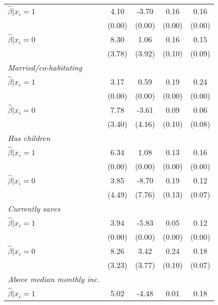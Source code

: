 \begin{table}[h]
{\begin{threeparttable}
\begin{tabular}{l*{4}{c}}
\hspace{0.5cm} \(\hat\beta|x_i=1\)&     4.10&    -3.70&     0.16&     0.16\\
                &   (0.00)&   (0.00)&   (0.00)&   (0.00)\\
\hspace{0.5cm} \(\hat\beta|x_i=0\)&     8.30&     1.06&     0.16&     0.15\\
                &   (3.78)&   (3.92)&   (0.10)&   (0.09)\\
\textit{Married/co-habitating}&         &         &         &         \\
\hspace{0.5cm} \(\hat\beta|x_i=1\)&     3.17&     0.59&     0.19&     0.24\\
                &   (0.00)&   (0.00)&   (0.00)&   (0.00)\\
\hspace{0.5cm} \(\hat\beta|x_i=0\)&     7.78&    -3.61&     0.09&     0.06\\
                &   (3.40)&   (4.16)&   (0.10)&   (0.08)\\
\textit{Has children}&         &         &         &         \\
\hspace{0.5cm} \(\hat\beta|x_i=1\)&     6.34&     1.08&     0.13&     0.16\\
                &   (0.00)&   (0.00)&   (0.00)&   (0.00)\\
\hspace{0.5cm} \(\hat\beta|x_i=0\)&     3.85&    -8.70&     0.19&     0.12\\
                &   (4.49)&   (7.76)&   (0.13)&   (0.07)\\
\textit{Currently saves}&         &         &         &         \\
\hspace{0.5cm} \(\hat\beta|x_i=1\)&     3.94&    -5.83&     0.05&     0.12\\
                &   (0.00)&   (0.00)&   (0.00)&   (0.00)\\
\hspace{0.5cm} \(\hat\beta|x_i=0\)&     8.26&     3.42&     0.24&     0.18\\
                &   (3.23)&   (3.77)&   (0.10)&   (0.07)\\
\textit{Above median monthly inc.}&         &         &         &         \\
\hspace{0.5cm} \(\hat\beta|x_i=1\)&     5.02&    -4.48&     0.01&     0.18\\

\end{tabular}
\end{threeparttable}}
\end{table}
